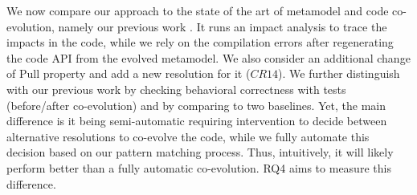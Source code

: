 	We now compare our approach to the state of the art of metamodel and code co-evolution, namely our previous work \cite{Khelladi2020}. It runs an impact analysis to trace the impacts in the code, while we rely on the compilation errors after regenerating the code API from the evolved metamodel. 
	We also consider an additional change of Pull property and add a new resolution for it ($CR14$). 
	We further distinguish with our previous work by checking behavioral correctness with tests (before/after co-evolution) and by comparing to two baselines. 
	Yet, the main difference is it being semi-automatic requiring intervention to decide between alternative resolutions to co-evolve the code, while we fully automate this decision based on our pattern matching process. Thus, intuitively, it will likely perform better than a fully automatic co-evolution. RQ4 aims to measure this difference.  
	
